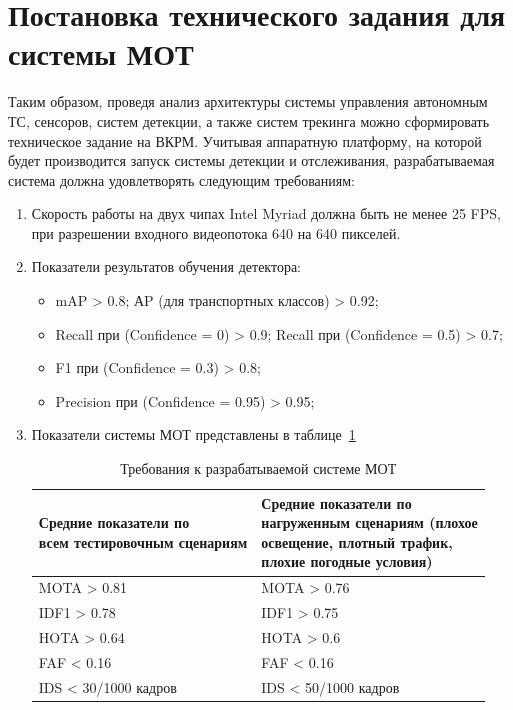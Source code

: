 \section{Постановка технического задания для системы МОТ}\label{sec:task}

Таким образом, проведя анализ архитектуры системы управления автономным ТС, сенсоров, систем детекции, а также систем трекинга можно сформировать техническое задание на ВКРМ. Учитывая аппаратную платформу, на которой будет производится запуск системы детекции и отслеживания, разрабатываемая система должна удовлетворять следующим требованиям:

\begin{enumerate}
    \item Скорость работы на двух чипах Intel Myriad должна быть не менее 25 FPS, при разрешении входного видеопотока 640 на 640 пикселей.
    \item Показатели результатов обучения детектора:
     \begin{itemize}
        \item mAP > 0.8; АP (для транспортных классов) > 0.92;
        \item Recall при (Confidence = 0) > 0.9; Recall при (Confidence = 0.5) > 0.7;
        \item F1 при (Confidence = 0.3) > 0.8;
        \item Precision при (Confidence = 0.95) > 0.95;
    \end{itemize}

    \item Показатели системы МОТ представлены в таблице~\ref{tab:mot_task}

    \begin{table}[h]
        \centering
        \caption{Требования к разрабатываемой системе МОТ}
        \label{tab:mot_task}
        \begin{tabular}{|l|l|}
            \hline
            \thead{Средние показатели по\\всем тестировочным сценариям} & \thead{Средние показатели по \\нагруженным сценариям (плохое\\освещение, плотный трафик,\\плохие погодные условия)} \\ \hline
            MOTA > 0.81             & MOTA > 0.76           \\ \hline
            IDF1 > 0.78             & IDF1 > 0.75           \\ \hline
            HOTA > 0.64             & HOTA > 0.6            \\ \hline
            FAF < 0.16              & FAF < 0.16            \\ \hline
            IDS < 30/1000 кадров    & IDS < 50/1000 кадров  \\ \hline
        \end{tabular}
    \end{table}

\end{enumerate}

